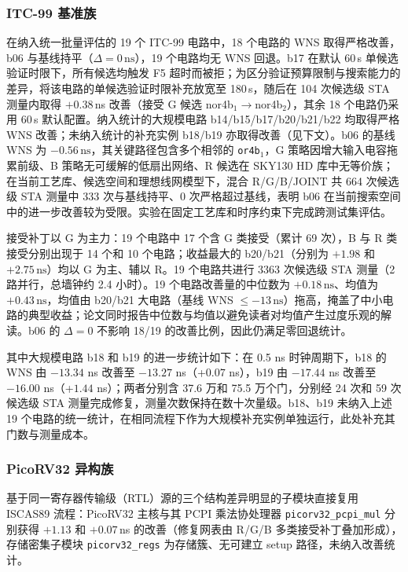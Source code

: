 \documentclass[twocolumn,10pt,fontset=windows]{ctexart}
\begin{document}
\subsubsection{ITC-99 基准族}\label{sec:itc99}

在纳入统一批量评估的 19 个 ITC-99 电路中，18 个电路的 WNS 取得严格改善，b06 与基线持平（$\Delta = 0\,\text{ns}$），19 个电路均无 WNS 回退。b17 在默认 60\,s 单候选验证时限下，所有候选均触发 F5 超时而被拒；为区分验证预算限制与搜索能力的差异，将该电路的单候选验证时限补充放宽至 180\,s，随后在 104 次候选级 STA 测量内取得 $+0.38\,$ns 改善（接受 G 候选 nor4b$_1\!\to\!$nor4b$_2$），其余 18 个电路仍采用 60\,s 默认配置。纳入统计的大规模电路 b14/b15/b17/b20/b21/b22 均取得严格 WNS 改善；未纳入统计的补充实例 b18/b19 亦取得改善（见下文）。b06 的基线 WNS 为 $-0.56\,\text{ns}$，其关键路径包含多个相邻的 \texttt{or4b$_1$}，G 策略因增大输入电容拖累前级、B 策略无可缓解的低扇出网络、R 候选在 SKY130 HD 库中无等价族；在当前工艺库、候选空间和理想线网模型下，混合 R/G/B/JOINT 共 664 次候选级 STA 测量中 333 次与基线持平、0 次严格超过基线，表明 b06 在当前搜索空间中的进一步改善较为受限。实验在固定工艺库和时序约束下完成跨测试集评估。

接受补丁以 G 为主力：19 个电路中 17 个含 G 类接受（累计 69 次），B 与 R 类接受分别出现于 14 个和 10 个电路；收益最大的 b20/b21（分别为 $+1.98$ 和 $+2.75\,\text{ns}$）均以 G 为主、辅以 R。19 个电路共进行 3363 次候选级 STA 测量（2 路并行，总墙钟约 2.4 小时）。19 个电路改善量的中位数为 $+0.18\,\text{ns}$、均值为 $+0.43\,\text{ns}$，均值由 b20/b21 大电路（基线 WNS $\le -13\,\text{ns}$）拖高，掩盖了中小电路的典型收益；论文同时报告中位数与均值以避免读者对均值产生过度乐观的解读。b06 的 $\Delta = 0$ 不影响 18/19 的改善比例，因此仍满足零回退统计。

其中大规模电路 b18 和 b19 的进一步统计如下：在 0.5 ns 时钟周期下，b18 的 WNS 由 $-13.34$ ns 改善至 $-13.27$ ns（+$0.07$ ns），b19 由 $-17.44$ ns 改善至 $-16.00$ ns（+$1.44$ ns）；两者分别含 37.6 万和 75.5 万个门，分别经 24 次和 59 次候选级 STA 测量完成修复，测量次数保持在数十次量级。b18、b19 未纳入上述 19 个电路的统一统计，在相同流程下作为大规模补充实例单独运行，此处补充其门数与测量成本。

\subsubsection{PicoRV32 异构族}

基于同一寄存器传输级（RTL）源的三个结构差异明显的子模块直接复用 ISCAS89 流程：PicoRV32 主核与其 PCPI 乘法协处理器 \texttt{picorv32\_pcpi\_mul} 分别获得 $+1.13$ 和 $+0.07\,$ns 的改善（修复网表由 R/G/B 多类接受补丁叠加形成），存储密集子模块 \texttt{picorv32\_regs} 为存储簇、无可建立 setup 路径，未纳入改善统计。
\end{document}
